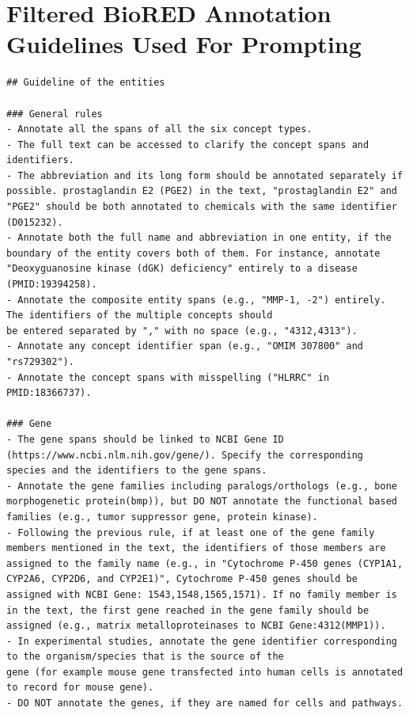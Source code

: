 \chapter{Filtered BioRED Annotation Guidelines Used For Prompting}
\label{app:filtered_biored_guidelines}
\begin{lstlisting}
## Guideline of the entities

### General rules
- Annotate all the spans of all the six concept types.
- The full text can be accessed to clarify the concept spans and identifiers.
- The abbreviation and its long form should be annotated separately if possible. prostaglandin E2 (PGE2) in the text, "prostaglandin E2" and "PGE2" should be both annotated to chemicals with the same identifier (D015232).
- Annotate both the full name and abbreviation in one entity, if the boundary of the entity covers both of them. For instance, annotate "Deoxyguanosine kinase (dGK) deficiency" entirely to a disease (PMID:19394258).
- Annotate the composite entity spans (e.g., "MMP-1, -2") entirely. The identifiers of the multiple concepts should
be entered separated by "," with no space (e.g., "4312,4313").
- Annotate any concept identifier span (e.g., "OMIM 307800" and "rs729302").
- Annotate the concept spans with misspelling ("HLRRC" in PMID:18366737).

### Gene
- The gene spans should be linked to NCBI Gene ID (https://www.ncbi.nlm.nih.gov/gene/). Specify the corresponding species and the identifiers to the gene spans.
- Annotate the gene families including paralogs/orthologs (e.g., bone morphogenetic protein(bmp)), but DO NOT annotate the functional based families (e.g., tumor suppressor gene, protein kinase).
- Following the previous rule, if at least one of the gene family members mentioned in the text, the identifiers of those members are assigned to the family name (e.g., in "Cytochrome P-450 genes (CYP1A1, CYP2A6, CYP2D6, and CYP2E1)", Cytochrome P-450 genes should be assigned with NCBI Gene: 1543,1548,1565,1571). If no family member is in the text, the first gene reached in the gene family should be assigned (e.g., matrix metalloproteinases to NCBI Gene:4312(MMP1)).
- In experimental studies, annotate the gene identifier corresponding to the organism/species that is the source of the
gene (for example mouse gene transfected into human cells is annotated to record for mouse gene).
- DO NOT annotate the genes, if they are named for cells and pathways.


\end{lstlisting}
